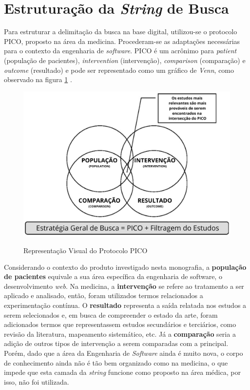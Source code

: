 \section{Estruturação da \textit{String} de Busca}

Para estruturar a delimitação da busca na base digital, utilizou-se o protocolo PICO, proposto na área da medicina. Procederam-se as adaptações necessárias para o contexto da engenharia de \textit{software}. PICO é um acrônimo para \textit{patient} (população de pacientes), \textit{intervention} (intervenção), \textit{comparison} (comparação) e \textit{outcome} (resultado) e pode ser representado como um gráfico de \textit{Venn}, como observado na figura \ref{fig:pico} \cite{pai_clinical_2004}.




\begin{figure}
    \centering
    \caption{Representação Visual do Protocolo PICO }
    \includegraphics[width=0.75\linewidth]{figuras/PICO.png}
    \label{fig:pico}
\end{figure}

Considerando o contexto do produto investigado nesta monografia, a \textbf{população de pacientes} equivale a sua área específica da engenharia de software, o desenvolvimento \textit{web}. Na medicina, a \textbf{intervenção} se refere ao tratamento a ser aplicado e analisado, então, foram utilizados termos relacionados a experimentação contínua. O \textbf{resultado} representa a saída relatada nos estudos a serem selecionados e, em busca de compreender o estado da arte, foram adicionados termos que representassem estudos secundários e terciários, como revisão da literatura, mapeamento sistemático, etc. Já a \textbf{comparação} seria a adição de outros tipos de intervenção a serem comparadas com a principal. Porém, dado que a área da Engenharia de \textit{Software} ainda é muito nova, o corpo de conhecimento ainda não é tão bem organizado como na medicina, o que impede que esta camada da \textit{string} funcione como proposto na área médica, por isso, não foi utilizada.

